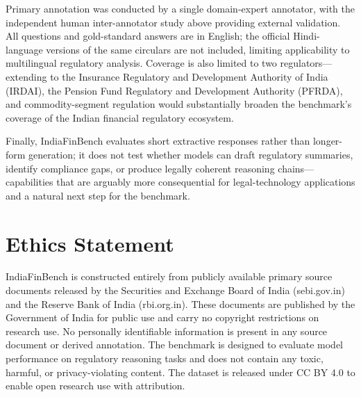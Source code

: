 \documentclass[11pt]{article}
\begin{document}
Primary annotation was conducted by a single domain-expert annotator, with the independent human inter-annotator study above providing external validation. All questions and gold-standard answers are in English; the official Hindi-language versions of the same circulars are not included, limiting applicability to multilingual regulatory analysis. Coverage is also limited to two regulators---extending to the Insurance Regulatory and Development Authority of India (IRDAI), the Pension Fund Regulatory and Development Authority (PFRDA), and commodity-segment regulation would substantially broaden the benchmark's coverage of the Indian financial regulatory ecosystem.

Finally, IndiaFinBench evaluates short extractive responses rather than longer-form generation; it does not test whether models can draft regulatory summaries, identify compliance gaps, or produce legally coherent reasoning chains---capabilities that are arguably more consequential for legal-technology applications and a natural next step for the benchmark.

\section*{Ethics Statement}

IndiaFinBench is constructed entirely from publicly available primary source documents released by the Securities and Exchange Board of India (sebi.gov.in) and the Reserve Bank of India (rbi.org.in). These documents are published by the Government of India for public use and carry no copyright restrictions on research use. No personally identifiable information is present in any source document or derived annotation. The benchmark is designed to evaluate model performance on regulatory reasoning tasks and does not contain any toxic, harmful, or privacy-violating content. The dataset is released under CC BY 4.0 to enable open research use with attribution.

\end{document}
